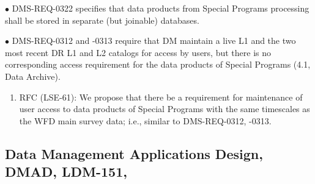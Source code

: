 \documentclass[DM,lsstdraft,toc]{lsstdoc}
\begin{document}
$\bullet$ DMS-REQ-0322 specifies that data products from Special Programs processing shall be stored in separate (but joinable) databases. 

$\bullet$ DMS-REQ-0312 and -0313 require that DM maintain a live L1 and the two most recent DR L1 and L2 catalogs for access by users, but there is no corresponding access requirement for the data products of Special Programs (4.1, Data Archive).
\begin{enumerate}[resume,topsep=-10pt,after=\vspace{10pt},label= \textbf{Action \Roman*}] \item \label{DMSR-7} RFC (LSE-61): We propose that there be a requirement for maintenance of user access to data products of Special Programs with the same timescales as the WFD main survey data; i.e., similar to DMS-REQ-0312, -0313. \end{enumerate}





\subsection{Data Management Applications Design, DMAD, LDM-151, \cite{LDM-151}}\label{ssec:docrev_dmad}
\end{document}
